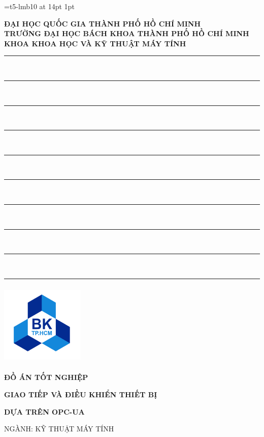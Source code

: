 \font\td=t5-lmb10 at 14pt
\setlength{\fboxsep} {1pt}
\begin{titlepage}


\begin{center}
    \textbf{ĐẠI HỌC QUỐC GIA THÀNH PHỐ HỒ CHÍ MINH}\\
    \textbf{TRƯỜNG ĐẠI HỌC BÁCH KHOA THÀNH PHỐ HỒ CHÍ MINH}\\
    \textbf{KHOA KHOA HỌC VÀ KỸ THUẬT MÁY TÍNH}\\
    \rule{0.1in}{1pt}\ \rule{0.1in}{1pt}\ \rule{0.1in}{1pt}\ \rule{0.1in}{1pt}\ \rule{0.1in}{1pt}\ \rule{0.1in}{1pt}\ \rule{0.1in}{1pt}\ \rule{0.1in}{1pt}\ \rule{0.1in}{1pt}\ \rule{0.1in}{1pt}
\end{center}

\vspace{0cm}
\begin{center}
\includegraphics[width=4cm,height=4cm]{Images/Logo BK.png}\\
\end{center}

\vspace{0cm}
\begin{center}
 {\bf {\td \Large ĐỒ ÁN TỐT NGHIỆP}}
\end{center}
\vspace{.4cm}

\begin{center}
    \centerline{\bf \td \Large GIAO TIẾP VÀ ĐIỀU KHIỂN THIẾT BỊ}
    \vspace{.1cm}
    \centerline{\bf \td \Large DỰA TRÊN OPC-UA}
    \vspace{.1cm}
    \vspace{.5cm}
    \centerline{NGÀNH: KỸ THUẬT MÁY TÍNH}
\end{center}


\end{titlepage}

